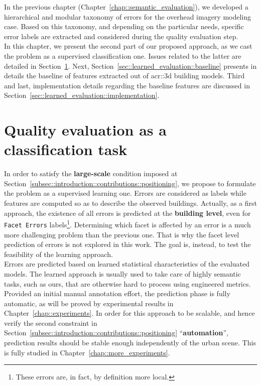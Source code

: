 \minitoc

\vfill

In the previous chapter (Chapter~\ref{chap::semantic_evaluation}), we developed a hierarchical and modular taxonomy of errors for the overhead imagery modeling case.
Based on this taxonomy, and depending on the particular needs, specific error labels are extracted and considered during the quality evaluation step.\\

In this chapter, we present the second part of our proposed approach, as we cast the problem as a supervised classification one.
Issues related to the latter are detailed in Section~\ref{sec::learned_evaluation::classification}.
Next, Section~\ref{sec::learned_evaluation::baseline} presents in details the baseline of features extracted out of \gls{acr::3d} building models.
Third and last, implementation details regarding the baseline features are discussed in Section~\ref{sec::learned_evaluation::implementation}.

\clearpage

\section{Quality evaluation as a classification task}
    \label{sec::learned_evaluation::classification}
    In order to satisfy the \textbf{large-scale} condition imposed at Section~\ref{subsec::introduction::contributions::positioning}, we propose to formulate the problem as a supervised learning one.
    Errors are considered as labels while features are computed so as to describe the observed buildings.
    Actually, as a first approach, the existence of all errors is predicted at the \textbf{building level}, even for \texttt{Facet Errors} labels\footnote{These errors are, in fact, by definition more local.}.
    Determining which facet is affected by an error is a much more challenging problem than the previous one.
    That is why the facet level prediction of errors is not explored in this work.
    The goal is, instead, to test the feasibility of the learning approach.\\

    Errors are predicted based on learned statistical characteristics of the evaluated models.
    The learned approach is usually used to take care of highly semantic tasks, such as ours, that are otherwise hard to process using engineered metrics.\\
    Provided an initial manual annotation effort, the prediction phase is fully automatic, as will be proved by experimental results in Chapter~\ref{chap::experiments}.
    In order for this approach to be scalable, and hence verify the second constraint in Section~\ref{subsec::introduction::contributions::positioning} ``\textbf{automation}'', prediction results should be stable enough independently of the urban scene.
    This is fully studied in Chapter~\ref{chap::more_experiments}.\\

